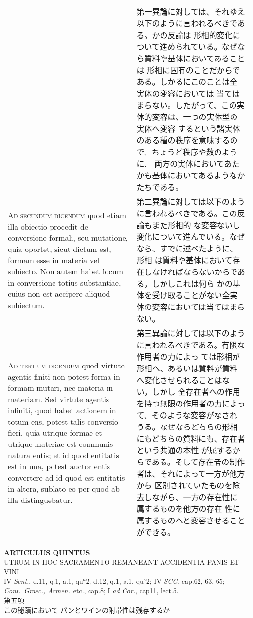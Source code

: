 \documentclass[10pt]{jsarticle} %
\begin{document}
\begin{longtable}{p{21em}p{21em}}
&

第一異論に対しては、それゆえ以下のように言われるべきである。かの反論は
形相的変化について進められている。なぜなら質料や基体においてあることは
形相に固有のことだからである。しかるにこのことは全実体の変容においては
当てはまらない。したがって、この実体的変容は、一つの実体型の実体へ変容
するという諸実体のある種の秩序を意味するので、ちょうど秩序や数のように、
両方の実体においてあたかも基体においてあるようなかたちである。


\\



{\scshape Ad secundum dicendum} quod etiam illa obiectio procedit de
conversione formali, seu mutatione, quia oportet, sicut dictum est,
formam esse in materia vel subiecto. Non autem habet locum in
conversione totius substantiae, cuius non est accipere aliquod
subiectum.

&

第二異論に対しては以下のように言われるべきである。この反論もまた形相的
な変容ないし変化について進んでいる。なぜなら、すでに述べたように、形相
は質料や基体において存在しなければならないからである。しかしこれは何ら
かの基体を受け取ることがない全実体の変容においては当てはまらない。

\\



{\scshape Ad tertium dicendum} quod virtute agentis finiti non potest
forma in formam mutari, nec materia in materiam. Sed virtute agentis
infiniti, quod habet actionem in totum ens, potest talis conversio
fieri, quia utrique formae et utrique materiae est communis natura
entis; et id quod entitatis est in una, potest auctor entis convertere
ad id quod est entitatis in altera, sublato eo per quod ab illa
distinguebatur.

&

第三異論に対しては以下のように言われるべきである。有限な作用者の力によっ
ては形相が形相へ、あるいは質料が質料へ変化させられることはない。しかし
全存在者への作用を持つ無限の作用者の力によって、そのような変容がなされ
うる。なぜならどちらの形相にもどちらの質料にも、存在者という共通の本性
が属するからである。そして存在者の制作者は、それによって一方が他方から
区別されていたものを除去しながら、一方の存在性に属するものを他方の存在
性に属するものへと変容させることができる。


\end{longtable}
\newpage


\begin{center}
{\Large {\bf ARTICULUS QUINTUS}}\\ {\large UTRUM IN HOC SACRAMENTO
REMANEANT ACCIDENTIA PANIS ET VINI}\\ {\footnotesize IV {\itshape
Sent.}, d.11, q.1, a.1, qu$^a$2; d.12, q.1, a.1, qu$^a$2; IV {\itshape
SCG}, cap.62, 63, 65; \\{\itshape Cont.~Graec., Armen.}~etc., cap.8; I
{\itshape ad Cor.}, cap11, lect.5.}\\ {\Large 第五項\\この秘蹟において
パンとワインの附帯性は残存するか}
\end{center}
\end{document}
